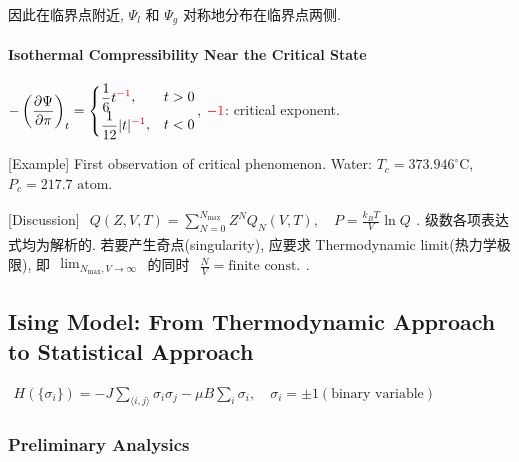 \documentclass[../../main.tex]{subfiles}
\begin{document}
因此在临界点附近, $\Psi_{l}$ 和 $\Psi_{g}$ 对称地分布在临界点两侧. 

\paragraph{Isothermal Compressibility Near the Critical State} 
$\begin{aligned}
    -\left(\frac{\partial\Psi}{\partial\pi}\right)_{t} = \begin{cases}
        \begin{aligned}
            \frac{1}{6}t^{{\color{red}{-1}}}
        \end{aligned}, &t>0\\
        \begin{aligned}
            \frac{1}{12}|t|^{{\color{red}{-1}}}
        \end{aligned}, &t<0
    \end{cases}
\end{aligned}$, ${\color{red}{-1}}$: critical exponent. 

[Example] First observation of critical phenomenon. Water: $T_{c} = 373.946^{\circ}\text{C}$, $P_{c} = 217.7\text{ atom}$.

[Discussion] $\begin{aligned}
    Q(Z,V,T) = \sum_{N=0}^{N_{\text{max}}}Z^{N}Q_{N}(V,T),\quad P = \frac{k_{B}T}{V}\ln{Q}
\end{aligned}$. 级数各项表达式均为解析的. 若要产生奇点(singularity), 应要求 Thermodynamic limit(热力学极限), 即 $\begin{aligned}
    \lim_{N_{\text{max}},V\rightarrow\infty}
\end{aligned}$ 的同时 $\begin{aligned}
    \frac{N}{V} = \text{finite const.}
\end{aligned}$. 

\subsection{Ising Model: From Thermodynamic Approach to Statistical Approach}

$\begin{aligned}
    H(\{\sigma_{i}\}) = -J\sum_{\langle i,j\rangle}\sigma_{i}\sigma_{j} - \mu B\sum_{i}\sigma_{i},\quad \sigma_{i} = \pm 1(\text{binary variable})
\end{aligned}$

\subsubsection{Preliminary Analysics}
\end{document}
